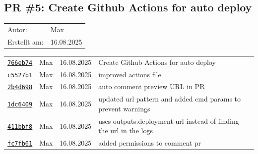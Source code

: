 \documentclass{article}%
\begin{document}
\subsection{PR \#5: Create Github Actions for auto deploy}%
\label{pr:5}%
\begin{tabular}{l l}%
Autor:&Max\\%
Erstellt am: &16.08.2025\\%
\end{tabular}%
\begin{longtable}{l l l p{12cm}}%
\href{https://github.com/scriptor1000/homeworks/pull/5/commits/766eb74bd9ff1b4c19d919f2396f99be1f58289e}{\underline{\texttt{766eb74}}}&Max&16.08.2025&Create Github Actions for auto deploy\\%
\href{https://github.com/scriptor1000/homeworks/pull/5/commits/c5527b12dbfebe636caa050e19a3f5b9d82d3486}{\underline{\texttt{c5527b1}}}&Max&16.08.2025&improved actions file\\%
\href{https://github.com/scriptor1000/homeworks/pull/5/commits/2b4d6989795b7f18614e2a868b369abeb93c8f07}{\underline{\texttt{2b4d698}}}&Max&16.08.2025&auto comment preview URL in PR\\%
\href{https://github.com/scriptor1000/homeworks/pull/5/commits/1dc6409ce4396a315705d68a38b08defad295e18}{\underline{\texttt{1dc6409}}}&Max&16.08.2025&updated url pattern and added cmd params to prevent warnings\\%
\href{https://github.com/scriptor1000/homeworks/pull/5/commits/411bbf8309e7825863e68ce332b40801a102d072}{\underline{\texttt{411bbf8}}}&Max&16.08.2025&uses outputs.deployment{-}url instead of finding the url in the logs\\%
\href{https://github.com/scriptor1000/homeworks/pull/5/commits/fc7fb61c2206cf600297e4cd3ceba2bcbd4a9d38}{\underline{\texttt{fc7fb61}}}&Max&16.08.2025&added permissions to comment pr\\%
\end{longtable}

%
\end{document}
